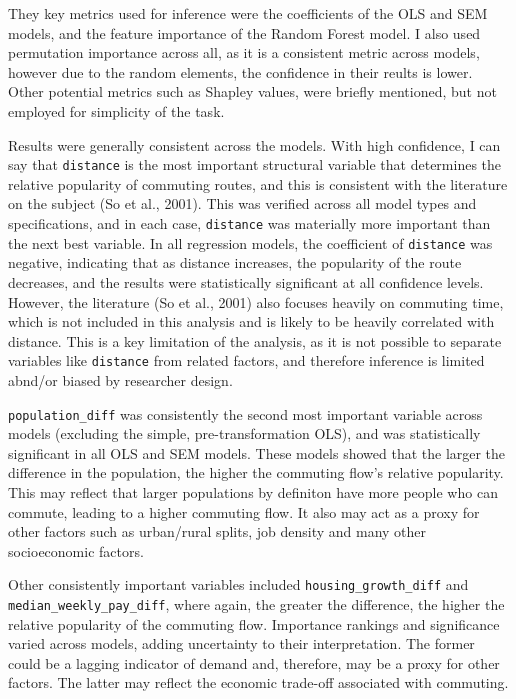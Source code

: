 \documentclass[
  number]{elsarticle}
\begin{document}
They key metrics used for inference were the coefficients of the OLS and
SEM models, and the feature importance of the Random Forest model. I
also used permutation importance across all, as it is a consistent
metric across models, however due to the random elements, the confidence
in their reults is lower. Other potential metrics such as Shapley
values, were briefly mentioned, but not employed for simplicity of the
task.

Results were generally consistent across the models. With high
confidence, I can say that
\texttt{\textquotesingle{}distance\textquotesingle{}} is the most
important structural variable that determines the relative popularity of
commuting routes, and this is consistent with the literature on the
subject (So et al., 2001). This was verified across all model types and
specifications, and in each case,
\texttt{\textquotesingle{}distance\textquotesingle{}} was materially
more important than the next best variable. In all regression models,
the coefficient of \texttt{\textquotesingle{}distance\textquotesingle{}}
was negative, indicating that as distance increases, the popularity of
the route decreases, and the results were statistically significant at
all confidence levels. However, the literature (So et al., 2001) also
focuses heavily on commuting time, which is not included in this
analysis and is likely to be heavily correlated with distance. This is a
key limitation of the analysis, as it is not possible to separate
variables like \texttt{\textquotesingle{}distance\textquotesingle{}}
from related factors, and therefore inference is limited abnd/or biased
by researcher design.

\texttt{\textquotesingle{}population\_diff\textquotesingle{}} was
consistently the second most important variable across models (excluding
the simple, pre-transformation OLS), and was statistically significant
in all OLS and SEM models. These models showed that the larger the
difference in the population, the higher the commuting flow's relative
popularity. This may reflect that larger populations by definiton have
more people who can commute, leading to a higher commuting flow. It also
may act as a proxy for other factors such as urban/rural splits, job
density and many other socioeconomic factors.

Other consistently important variables included
\texttt{\textquotesingle{}housing\_growth\_diff\textquotesingle{}} and
\texttt{\textquotesingle{}median\_weekly\_pay\_diff\textquotesingle{}},
where again, the greater the difference, the higher the relative
popularity of the commuting flow. Importance rankings and significance
varied across models, adding uncertainty to their interpretation. The
former could be a lagging indicator of demand and, therefore, may be a
proxy for other factors. The latter may reflect the economic trade-off
associated with commuting.
\end{document}
